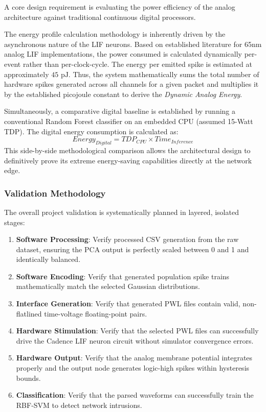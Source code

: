\documentclass{ieeeaccess}
\begin{document}
A core design requirement is evaluating the power efficiency of the analog architecture against traditional continuous digital processors. 

The energy profile calculation methodology is inherently driven by the asynchronous nature of the LIF neurons. Based on established literature for 65nm analog LIF implementations, the power consumed is calculated dynamically per-event rather than per-clock-cycle. The energy per emitted spike is estimated at approximately $45\text{ pJ}$. Thus, the system mathematically sums the total number of hardware spikes generated across all channels for a given packet and multiplies it by the established picojoule constant to derive the \textit{Dynamic Analog Energy}. 

Simultaneously, a comparative digital baseline is established by running a conventional Random Forest classifier on an embedded CPU (assumed 15-Watt TDP). The digital energy consumption is calculated as:
\begin{equation}
Energy_{Digital} = TDP_{CPU} \times Time_{Inference}
\end{equation}
This side-by-side methodological comparison allows the architectural design to definitively prove its extreme energy-saving capabilities directly at the network edge.

\subsubsection{Validation Methodology}

The overall project validation is systematically planned in layered, isolated stages:
\begin{enumerate}
\item \textbf{Software Processing}: Verify processed CSV generation from the raw dataset, ensuring the PCA output is perfectly scaled between 0 and 1 and identically balanced.
\item \textbf{Software Encoding}: Verify that generated population spike trains mathematically match the selected Gaussian distributions.
\item \textbf{Interface Generation}: Verify that generated PWL files contain valid, non-flatlined time-voltage floating-point pairs.
\item \textbf{Hardware Stimulation}: Verify that the selected PWL files can successfully drive the Cadence LIF neuron circuit without simulator convergence errors.
\item \textbf{Hardware Output}: Verify that the analog membrane potential integrates properly and the output node generates logic-high spikes within hysteresis bounds.
\item \textbf{Classification}: Verify that the parsed waveforms can successfully train the RBF-SVM to detect network intrusions.
\end{enumerate}
\end{document}
